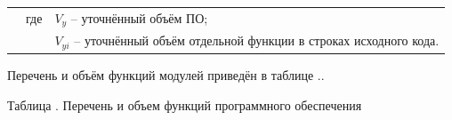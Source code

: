 {    \begin{tabular}{p{0.875cm}p{0.3cm}p{15.175cm}}
        & где  & $V_y$ {--} уточнённый объём ПО; \\
        &      & $V_{yi}$ {--} уточнённый объём отдельной функции в строках исходного кода. \\
    \end{tabular}
    \vspace{13pt}
    
    \par \redline Перечень и объём функций модулей приведён в таблице \thechaptercntr .\thetablecntr.

    \topTablespace
    {\begin{Center}
        \par \gostFont Таблица \thechaptercntr .\thetablecntr \spc {--} Перечень и объем функций программного обеспечения


\end{Center}}}
